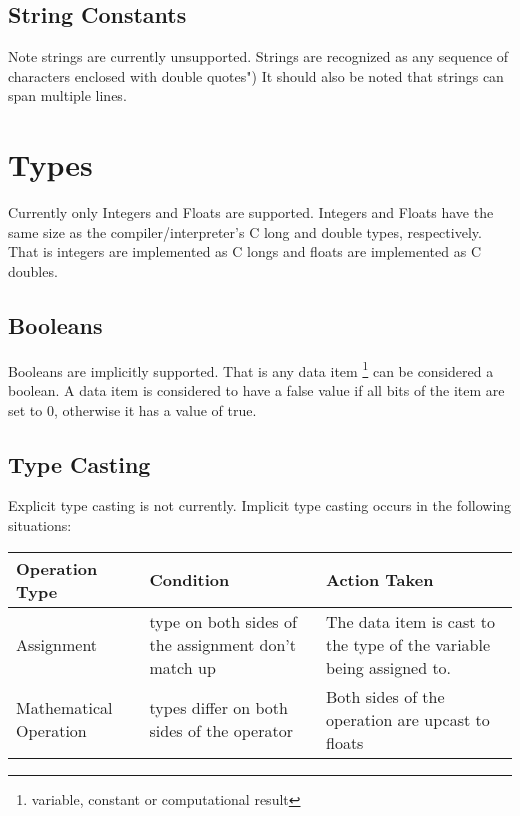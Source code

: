 \documentclass{standalone}
\begin{document}
		\subsection{String Constants}
			Note strings are currently unsupported.
			Strings are recognized as any sequence of characters enclosed with double quotes") It should also be noted that strings can span multiple lines.

	\section{Types}
		Currently only Integers and Floats are supported. Integers and Floats have the same size as the compiler/interpreter's C long and double types, respectively. That is integers are implemented as C longs and floats are implemented as C doubles.

		\subsection{Booleans}
			Booleans are implicitly supported. That is any data item \footnote{ variable, constant or computational result} can be considered a boolean. A data item is considered to have a false value if all bits of the item are set to 0, otherwise it has a value of true.

		\subsection{Type Casting}
			Explicit type casting is not currently.
			Implicit type casting occurs in the following situations:\\
			\begin{tabular}{| l | p{5cm} | p{5cm}|}
				\hline
				Operation Type & Condition & Action Taken \\ 
				\hline
				Assignment	& type on both sides of the assignment don't match up & The data item is cast to the type of the variable being assigned to. \\ 
				\hline
				Mathematical Operation & types differ on both sides of the operator & Both sides of the operation are upcast to floats\\
				\hline
			\end{tabular}
\end{document}
